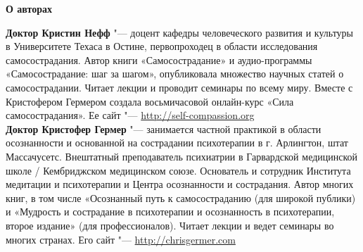 
{\bf \Huge О авторах\\[2cm]}

{\bf Доктор Кристин Нефф} "--- доцент кафедры человеческого развития и культуры в Университете Техаса в Остине, первопроходец в области исследования самосострадания. Автор книги «Самосострадание» и аудио-программы «Самосострадание: шаг за шагом», опубликовала множество научных статей о самосострадании. Читает лекции и проводит семинары по всему миру. Вместе с Кристофером Гермером создала восьмичасовой онлайн-курс «Сила самосострадания». Ее сайт "--- \url{http://self-compassion.org}\\[1mm]
	
{\bf Доктор Кристофер Гермер} "--- занимается частной практикой в области осознанности и основанной на сострадании психотерапии в г. Арлингтон, штат Массачусетс. Внештатный преподаватель психиатрии в Гарвардской медицинской школе / Кембриджском медицинском союзе. Основатель и сотрудник Института медитации и психотерапии и Центра осознанности и сострадания. Автор многих книг, в том числе «Осознанный путь к самосостраданию (для широкой публики) и «Мудрость и сострадание в психотерапии и осознанность в психотерапии, второе издание» (для профессионалов). Читает лекции и ведет семинары во многих странах. Его сайт "--- \url{http://chrisgermer.com}
	